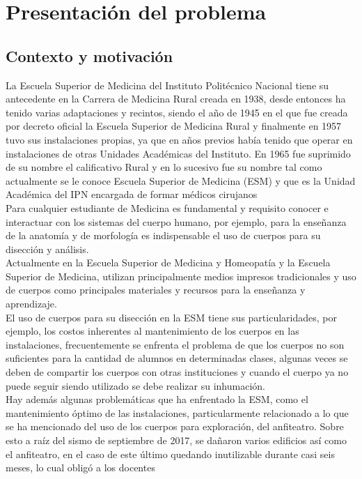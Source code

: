\chapter{Presentación del problema}

\section{Contexto y motivación}
La Escuela Superior de Medicina del Instituto Politécnico Nacional tiene su antecedente en la Carrera de Medicina Rural creada en 1938, 
desde entonces ha tenido varias adaptaciones y recintos, siendo el año de 1945 en el que fue creada por decreto oficial la Escuela Superior de Medicina 
Rural y finalmente en 1957 tuvo sus instalaciones propias, ya que en años previos había tenido que operar en instalaciones de otras Unidades Académicas 
del Instituto. En 1965 fue suprimido de su nombre el calificativo Rural y en lo sucesivo fue su nombre tal como actualmente se le conoce Escuela Superior 
de Medicina (ESM) y que es la Unidad Académica del IPN encargada de formar médicos cirujanos\cite{web51}\\
Para cualquier estudiante de Medicina es fundamental y requisito conocer e interactuar con los sistemas del cuerpo humano, por ejemplo,  
para la enseñanza de la anatomía y de morfología es indispensable el uso de cuerpos para su disección y análisis.\\
Actualmente en la Escuela Superior de Medicina y Homeopatía y la Escuela Superior de Medicina, utilizan principalmente medios impresos 
tradicionales y uso de cuerpos como principales materiales y recursos para  la enseñanza y aprendizaje.\\
El uso de cuerpos para su disección en la ESM tiene sus particularidades, por ejemplo, los costos inherentes al mantenimiento de los cuerpos 
en las instalaciones, frecuentemente se enfrenta el problema de que los cuerpos no son suficientes para la cantidad de alumnos en determinadas 
clases, algunas veces se deben de compartir los cuerpos con otras instituciones y cuando el cuerpo ya no puede seguir siendo utilizado se debe 
realizar su inhumación.\\
Hay además algunas problemáticas que ha enfrentado la ESM, como el mantenimiento óptimo de las instalaciones, particularmente relacionado a 
lo que se ha mencionado del uso de los cuerpos para exploración, del anfiteatro. Sobre esto a raíz del sismo de septiembre de 2017, se dañaron 
varios edificios así como el anfiteatro, en el caso de este último quedando inutilizable durante casi seis meses, lo cual obligó  a los docentes 
